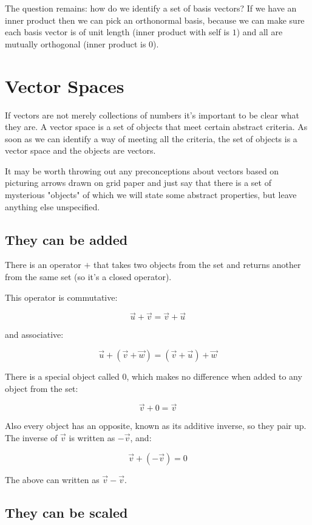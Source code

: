 The question remains: how do we identify a set of basis vectors? If we have an inner product then we can pick an orthonormal basis, because we can make sure each basis vector is of unit length (inner product with self is $1$) and all are mutually orthogonal (inner product is $0$).

\section{Vector Spaces}\label{sec:vectors-space}

If vectors are not merely collections of numbers it's important to be clear what they are. A vector space is a set of objects that meet certain abstract criteria. As soon as we can identify a way of meeting all the criteria, the set of objects is a vector space and the objects are vectors.

It may be worth throwing out any preconceptions about vectors based on picturing arrows drawn on grid paper and just say that there is a set of mysterious "objects" of which we will state some abstract properties, but leave anything else unspecified.

\subsection{They can be added}

There is an operator $+$ that takes two objects from the set and returns another from the same set (so it's a closed operator).

This operator is commutative:

$$\vec{u} + \vec{v} = \vec{v} + \vec{u}$$

and associative:

$$\vec{u} + (\vec{v} + \vec{w}) = (\vec{v} + \vec{u}) + \vec{w}$$

There is a special object called $0$, which makes no difference when added to any object from the set:

$$\vec{v} + 0 = \vec{v}$$

Also every object has an opposite, known as its additive inverse, so they pair up. The inverse of $\vec{v}$ is written as $-\vec{v}$, and:

$$\vec{v} + (-\vec{v}) = 0$$

The above can written as $\vec{v} - \vec{v}$.

\subsection{They can be scaled}

